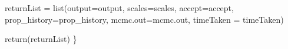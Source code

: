 \documentclass[
]{article}
\newenvironment{Shaded}{\begin{snugshade}}{\end{snugshade}}
\newcommand{\AttributeTok}[1]{\textcolor[rgb]{0.40,0.45,0.13}{#1}}
\newcommand{\FunctionTok}[1]{\textcolor[rgb]{0.28,0.35,0.67}{#1}}
\newcommand{\NormalTok}[1]{\textcolor[rgb]{0.00,0.23,0.31}{#1}}
\newcommand{\OtherTok}[1]{\textcolor[rgb]{0.00,0.23,0.31}{#1}}
\begin{document}
\begin{Shaded}
\begin{Highlighting}[]
\NormalTok{  returnList }\OtherTok{=} \FunctionTok{list}\NormalTok{(}\AttributeTok{output=}\NormalTok{output,}
                    \AttributeTok{scales=}\NormalTok{scales,}
                    \AttributeTok{accept=}\NormalTok{accept,}
                    \AttributeTok{prop\_history=}\NormalTok{prop\_history,}
                    \AttributeTok{mcmc.out=}\NormalTok{mcmc.out,}
                    \AttributeTok{timeTaken =}\NormalTok{ timeTaken)}


  \FunctionTok{return}\NormalTok{(returnList)}
\NormalTok{\}}
\end{Highlighting}
\end{Shaded}



  
\end{document}
